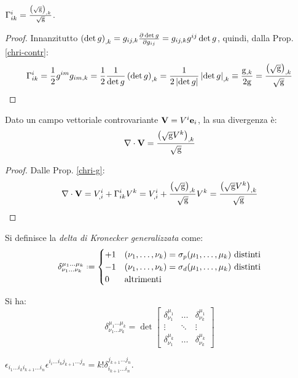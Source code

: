 \begin{proposition}\label{chri-g}
	$ \Gamma^i_{ik} = \frac{\left( \sqrt{\mathrm{g}} \right)_{,k}}{\sqrt{\mathrm{g}}} $.
\end{proposition}
\begin{proof}
	Innanzitutto $ \left( \det g \right)_{,k} = g_{ij,k} \frac{\partial\det g}{\partial g_{ij}} = g_{ij,k} g^{ij} \det g $, quindi, dalla Prop. \ref{chri-contr}:
	\begin{equation*}
		\Gamma^i_{ik} = \frac{1}{2} g^{im} g_{im,k} = \frac{1}{2} \frac{1}{\det g} \left( \det g \right)_{,k} = \frac{1}{2\left\lvert\det g\right\rvert} \left\lvert\det g\right\rvert_{,k} \equiv \frac{\mathrm{g}_{,k}}{2\mathrm{g}} = \frac{\left( \sqrt{\mathrm{g}} \right)_{,k}}{\sqrt{\mathrm{g}}}
	\end{equation*}
\end{proof}

\begin{proposition}\label{dive-cov}
	Dato un campo vettoriale controvariante $ \mathbf{V} = V^i \mathbf{e}_i $, la sua divergenza è:
	\begin{equation}
		\nabla\cdot\mathbf{V} = \frac{\left( \sqrt{\mathrm{g}} V^k \right)_{,k}}{\sqrt{\mathrm{g}}}
		\label{eq:4.21}
	\end{equation}
\end{proposition}
\begin{proof}
	Dalle Prop. \ref{chri-g}:
	\begin{equation*}
		\nabla\cdot\mathbf{V} = V^i_{,i} + \Gamma^i_{ik} V^k = V^i_{,i} + \frac{\left( \sqrt{\mathrm{g}} \right)_{,k}}{\sqrt{\mathrm{g}}} V^k = \frac{\left( \sqrt{\mathrm{g}} V^k \right)_{,k}}{\sqrt{\mathrm{g}}}
	\end{equation*}
\end{proof}

\begin{definition}
	Si definisce la \textit{delta di Kronecker generalizzata} come:
	\begin{equation}
		\delta^{\mu_1 \dots \mu_k}_{\nu_1 \dots \nu_k} \defeq
		\begin{cases}
			+1 & (\nu_1,\dots,\nu_k) = \sigma_p (\mu_1,\dots,\mu_k) \text{ distinti} \\
			-1 & (\nu_1,\dots,\nu_k) = \sigma_d (\mu_1,\dots,\mu_k) \text{ distinti} \\
			0 & \text{altrimenti}
		\end{cases}
		\label{eq:4.22}
	\end{equation}
\end{definition}
\begin{lemma}
	Si ha:
	\begin{equation}
		\delta^{\mu_1 \dots \mu_k}_{\nu_1 \dots \nu_k} = \det
		\begin{bmatrix}
			\delta^{\mu_1}_{\nu_1} & \dots & \delta^{\mu_1}_{\nu_k}\\
			\vdots & \ddots & \vdots\\
			\delta^{\mu_k}_{\nu_1} & \dots & \delta^{\mu_k}_{\nu_k}
		\end{bmatrix}
		\label{eq:4.23}
	\end{equation}
\end{lemma}
\begin{lemma}\label{eps-gen}
	$ \epsilon_{i_1 \dots i_k i_{k+1} \dots i_n} \epsilon^{i_i \dots i_k j_{k+1} \dots j_n} = k! \delta^{j_{k+1} \dots j_n}_{i_{k+1} \dots i_n} $.
\end{lemma}

